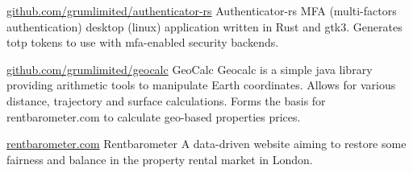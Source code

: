 

\begin{cventries}

  \cventry
    {\href{https://github.com/grumlimited/authenticator-rs}{github.com/grumlimited/authenticator-rs}} %
     {\hspace{0.2em}Authenticator-rs} %
    {} %
    {} %
    {}
    {
MFA (multi-factors authentication) desktop (linux) application written in Rust and gtk3. Generates totp tokens to use with mfa-enabled security backends.
    }


  \cventry
    {\href{https://github.com/grumlimited/geocalc}{github.com/grumlimited/geocalc}} %
    {\hspace{0.2em}GeoCalc} %
    {} %
    {} %
    {}
    {
Geocalc is a simple java library providing arithmetic tools to manipulate Earth coordinates. Allows for various distance, trajectory and surface calculations. Forms the basis for rentbarometer.com
to calculate geo-based properties prices.
    }

  \cventry
    {\href{https://www.rentbarometer.com}{rentbarometer.com}} %
    {\hspace{0.5em}Rentbarometer} %
    {} %
    {} %
    {}
    {
A data-driven website aiming to restore some fairness and balance in the property rental market in London.
    }
\end{cventries}

